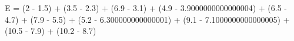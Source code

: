 \documentclass[preview]{standalone}
\begin{document}
\begin{center}
E = (2 - 1.5) + (3.5 - 2.3) + (6.9 - 3.1) + (4.9 - 3.9000000000000004) + (6.5 - 4.7) + (7.9 - 5.5) + (5.2 - 6.300000000000001) + (9.1 - 7.1000000000000005) + (10.5 - 7.9) + (10.2 - 8.7)
\end{center}
\end{document}
